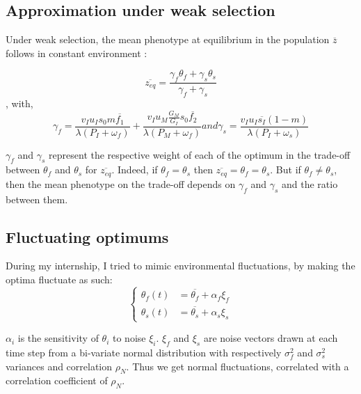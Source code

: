\subsection*{Approximation under weak selection}

Under weak selection, the mean phenotype at equilibrium in the population $\overline{z}$ follows in constant environment \citep{engen_evolution_2011}:

\begin{equation}
	\label{eq:zweak}
	\overline{z_{eq}} = \frac{\gamma_{f}\theta_{f} + \gamma_{s}\theta_{s}}{\gamma_{f} + \gamma_{s}}
\end{equation}
, with,
\begin{subequations}
	\begin{equation}
	\label{eq:gammaf}
	\gamma_{f} = \frac{v_{I} u_{I} s_{0} m \overline{f_{1}} }{\lambda(P_{I}+\omega_{f})} + \frac{ v_{I} u_{M} \frac{G_{M}}{G_{I}} s_{0} \overline{f_{2}}}{\lambda ( P_{M} + \omega_{f} )}
	\end{equation}
	and
	\begin{equation}
	\label{eq:gammas}
	\gamma_{s} = \frac{ v_{I} u_{I} \overline{s_{I}} (1-m) }{\lambda(P_{I}+\omega_{s})}
	\end{equation}
\end{subequations}

$\gamma_f$ and $\gamma_s$ represent the respective weight of each of the optimum in the trade-off between $\theta_f$ and $\theta_s$ for $\overline{z_{eq}}$. Indeed, if $\theta_f = \theta_s$ then $\overline{z_{eq}} = \theta_f = \theta_s$. But if $\theta_f \neq \theta_s$, then the mean phenotype on the trade-off depends on $\gamma_f$ and $\gamma_s$ and the ratio between them.

\subsection*{Fluctuating optimums}

During my internship, I tried to mimic environmental fluctuations, by making the optima fluctuate as such:
\begin{equation}
\left\{
	\begin{aligned}
		\theta_f(t) &= \overline{\theta_f} + \alpha_f \xi_f \\
		\theta_s(t) &= \overline{\theta_s} + \alpha_s \xi_s
	\end{aligned}
\right.
\end{equation}

$\alpha_i$ is the sensitivity of $\theta_i$ to noise $\xi_i$. $\xi_f$ and $\xi_s$ are noise vectors drawn at each time step from a bi-variate normal distribution with respectively $\sigma_f^2$ and $\sigma_s^2$ variances and correlation $\rho_N$. Thus we get normal fluctuations, correlated with a correlation coefficient of $\rho_N$.

